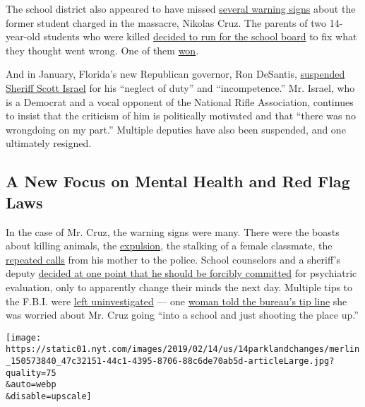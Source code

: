 The school district also appeared to have missed
\href{https://www.nytimes.com/2018/03/18/us/nikolas-cruz-baker-act.html}{several
warning signs} about the former student charged in the massacre, Nikolas
Cruz. The parents of two 14-year-old students who were killed
\href{https://www.nytimes.com/2018/05/15/us/parkland-parents-school-board.html}{decided
to run for the school board} to fix what they thought went wrong. One of
them
\href{https://www.nytimes.com/2018/08/28/us/parkland-school-board-election.html}{won}.

And in January, Florida's new Republican governor, Ron DeSantis,
\href{https://www.nytimes.com/2019/01/09/us/parkland-shooting-desantis-scott-israel.html}{suspended
Sheriff Scott Israel} for his ``neglect of duty'' and ``incompetence.''
Mr. Israel, who is a Democrat and a vocal opponent of the National Rifle
Association, continues to insist that the criticism of him is
politically motivated and that ``there was no wrongdoing on my part.''
Multiple deputies have also been suspended, and one ultimately resigned.

\hypertarget{a-new-focus-on-mental-health-and-red-flag-laws}{%
\subsection{A New Focus on Mental Health and Red Flag
Laws}\label{a-new-focus-on-mental-health-and-red-flag-laws}}

In the case of Mr. Cruz, the warning signs were many. There were the
boasts about killing animals, the
\href{https://www.nytimes.com/2018/02/14/us/nikolas-cruz-florida-shooting.html}{expulsion},
the stalking of a female classmate, the
\href{https://www.nytimes.com/2018/02/15/us/nikolas-cruz-florida-shooting.html}{repeated
calls} from his mother to the police. School counselors and a sheriff's
deputy
\href{https://www.nytimes.com/2018/03/18/us/nikolas-cruz-baker-act.html}{decided
at one point that he should be forcibly committed} for psychiatric
evaluation, only to apparently change their minds the next day. Multiple
tips to the F.B.I. were
\href{https://www.nytimes.com/2018/02/16/us/fbi-nikolas-cruz-shooting.html}{left
uninvestigated} --- one
\href{https://www.nytimes.com/2018/02/23/us/fbi-tip-nikolas-cruz.html}{woman
told the bureau's tip line} she was worried about Mr. Cruz going ``into
a school and just shooting the place up.''

\texttt{[image: https://static01.nyt.com/images/2019/02/14/us/14parklandchanges/merlin\_150573840\_47c32151-44c1-4395-8706-88c6de70ab5d-articleLarge.jpg?quality=75\\\&auto=webp\\\&disable=upscale]}

